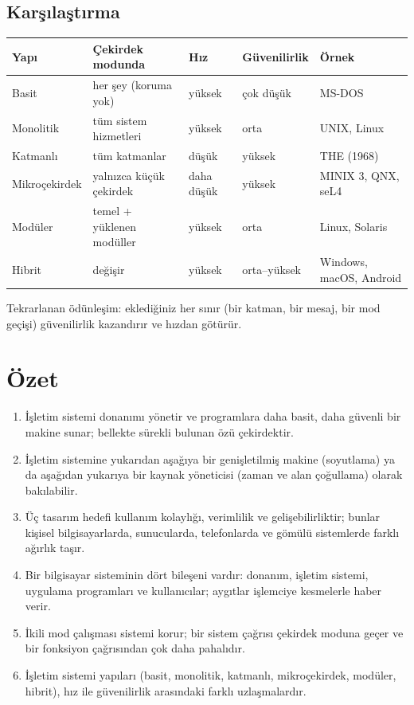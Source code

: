 \subsection{Karşılaştırma}

\begin{center}
\renewcommand{\arraystretch}{1.3}
\begin{tabular}{@{}lllll@{}}
\toprule
\textbf{Yapı} & \textbf{Çekirdek modunda} & \textbf{Hız} & \textbf{Güvenilirlik} & \textbf{Örnek} \\
\midrule
Basit & her şey (koruma yok) & yüksek & çok düşük & MS-DOS \\
Monolitik & tüm sistem hizmetleri & yüksek & orta & UNIX, Linux \\
Katmanlı & tüm katmanlar & düşük & yüksek & THE (1968) \\
Mikroçekirdek & yalnızca küçük çekirdek & daha düşük & yüksek & MINIX 3, QNX, seL4 \\
Modüler & temel + yüklenen modüller & yüksek & orta & Linux, Solaris \\
Hibrit & değişir & yüksek & orta--yüksek & Windows, macOS, Android \\
\bottomrule
\end{tabular}
\end{center}

Tekrarlanan ödünleşim: eklediğiniz her sınır (bir katman, bir mesaj, bir mod geçişi) güvenilirlik kazandırır ve hızdan götürür.

\section{Özet}

\begin{keyidea}
\begin{enumerate}[leftmargin=1.4em]
  \item İşletim sistemi donanımı yönetir ve programlara daha basit, daha güvenli bir makine sunar; bellekte sürekli bulunan özü çekirdektir.
  \item İşletim sistemine yukarıdan aşağıya bir genişletilmiş makine (soyutlama) ya da aşağıdan yukarıya bir kaynak yöneticisi (zaman ve alan çoğullama) olarak bakılabilir.
  \item Üç tasarım hedefi kullanım kolaylığı, verimlilik ve gelişebilirliktir; bunlar kişisel bilgisayarlarda, sunucularda, telefonlarda ve gömülü sistemlerde farklı ağırlık taşır.
  \item Bir bilgisayar sisteminin dört bileşeni vardır: donanım, işletim sistemi, uygulama programları ve kullanıcılar; aygıtlar işlemciye kesmelerle haber verir.
  \item İkili mod çalışması sistemi korur; bir sistem çağrısı çekirdek moduna geçer ve bir fonksiyon çağrısından çok daha pahalıdır.
  \item İşletim sistemi yapıları (basit, monolitik, katmanlı, mikroçekirdek, modüler, hibrit), hız ile güvenilirlik arasındaki farklı uzlaşmalardır.
\end{enumerate}
\end{keyidea}

